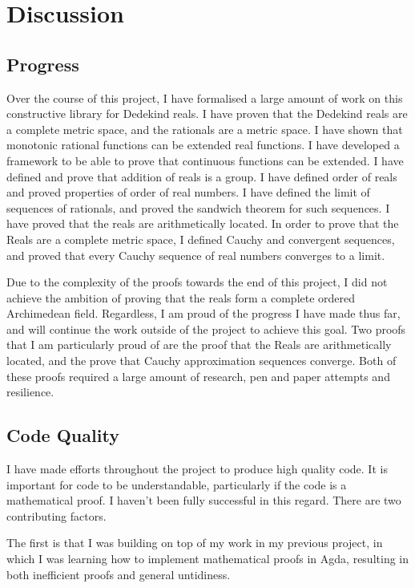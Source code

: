 \documentclass[ProjectReport]{subfiles}
\begin{document}
\section{Discussion}

\subsection{Progress}
Over the course of this project, I have formalised a large amount of work on this constructive library for Dedekind reals. I have proven that the Dedekind reals are a complete metric space, and the rationals are a metric space. I have shown that monotonic rational functions can be extended real functions. I have developed a framework to be able to prove that continuous functions can be extended. I have defined and prove that addition of reals is a group. I have defined order of reals and proved properties of order of real numbers. I have defined the limit of sequences of rationals, and proved the sandwich theorem for such sequences. I have proved that the reals are arithmetically located. In order to prove that the Reals are a complete metric space, I defined Cauchy and convergent sequences, and proved that every Cauchy sequence of real numbers converges to a limit. 

Due to the complexity of the proofs towards the end of this project, I did not achieve the ambition of proving that the reals form a complete ordered Archimedean field. Regardless, I am proud of the progress I have made thus far, and will continue the work outside of the project to achieve this goal. Two proofs that I am particularly proud of are the proof that the Reals are arithmetically located, and the prove that Cauchy approximation sequences converge. Both of these proofs required a large amount of research, pen and paper attempts and resilience. 

\subsection{Code Quality}

I have made efforts throughout the project to produce high quality code. It is important for code to be understandable, particularly if the code is a mathematical proof. I haven't been fully successful in this regard. There are two contributing factors. 

The first is that I was building on top of my work in my previous project, in which I was learning how to implement mathematical proofs in Agda, resulting in both inefficient proofs and general untidiness. 
\end{document}
